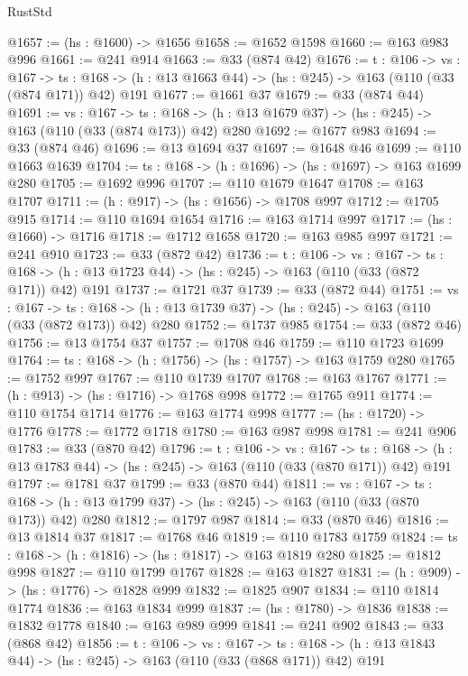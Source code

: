 \begin{lexlean}{RustStd}
\begin{coremodule}
{\begin{coremodule}
{{{@1657 := (hs : @1600) -> @1656
@1658 := @1652 @1598
@1660 := @163 @983 @996
@1661 := @241 @914
@1663 := @33 (@874 @42)
@1676 := {t : @106} ->
  {vs : @167} ->
  {ts : @168} -> (h : @13 @1663 @44) -> (hs : @245) -> @163 (@110 (@33 (@874 @171)) @42) @191
@1677 := @1661 @37
@1679 := @33 (@874 @44)
@1691 := {vs : @167} ->
  {ts : @168} -> (h : @13 @1679 @37) -> (hs : @245) -> @163 (@110 (@33 (@874 @173)) @42) @280
@1692 := @1677 @983
@1694 := @33 (@874 @46)
@1696 := @13 @1694 @37
@1697 := @1648 @46
@1699 := @110 @1663 @1639
@1704 := {ts : @168} -> (h : @1696) -> (hs : @1697) -> @163 @1699 @280
@1705 := @1692 @996
@1707 := @110 @1679 @1647
@1708 := @163 @1707
@1711 := (h : @917) -> (hs : @1656) -> @1708 @997
@1712 := @1705 @915
@1714 := @110 @1694 @1654
@1716 := @163 @1714 @997
@1717 := (hs : @1660) -> @1716
@1718 := @1712 @1658
@1720 := @163 @985 @997
@1721 := @241 @910
@1723 := @33 (@872 @42)
@1736 := {t : @106} ->
  {vs : @167} ->
  {ts : @168} -> (h : @13 @1723 @44) -> (hs : @245) -> @163 (@110 (@33 (@872 @171)) @42) @191
@1737 := @1721 @37
@1739 := @33 (@872 @44)
@1751 := {vs : @167} ->
  {ts : @168} -> (h : @13 @1739 @37) -> (hs : @245) -> @163 (@110 (@33 (@872 @173)) @42) @280
@1752 := @1737 @985
@1754 := @33 (@872 @46)
@1756 := @13 @1754 @37
@1757 := @1708 @46
@1759 := @110 @1723 @1699
@1764 := {ts : @168} -> (h : @1756) -> (hs : @1757) -> @163 @1759 @280
@1765 := @1752 @997
@1767 := @110 @1739 @1707
@1768 := @163 @1767
@1771 := (h : @913) -> (hs : @1716) -> @1768 @998
@1772 := @1765 @911
@1774 := @110 @1754 @1714
@1776 := @163 @1774 @998
@1777 := (hs : @1720) -> @1776
@1778 := @1772 @1718
@1780 := @163 @987 @998
@1781 := @241 @906
@1783 := @33 (@870 @42)
@1796 := {t : @106} ->
  {vs : @167} ->
  {ts : @168} -> (h : @13 @1783 @44) -> (hs : @245) -> @163 (@110 (@33 (@870 @171)) @42) @191
@1797 := @1781 @37
@1799 := @33 (@870 @44)
@1811 := {vs : @167} ->
  {ts : @168} -> (h : @13 @1799 @37) -> (hs : @245) -> @163 (@110 (@33 (@870 @173)) @42) @280
@1812 := @1797 @987
@1814 := @33 (@870 @46)
@1816 := @13 @1814 @37
@1817 := @1768 @46
@1819 := @110 @1783 @1759
@1824 := {ts : @168} -> (h : @1816) -> (hs : @1817) -> @163 @1819 @280
@1825 := @1812 @998
@1827 := @110 @1799 @1767
@1828 := @163 @1827
@1831 := (h : @909) -> (hs : @1776) -> @1828 @999
@1832 := @1825 @907
@1834 := @110 @1814 @1774
@1836 := @163 @1834 @999
@1837 := (hs : @1780) -> @1836
@1838 := @1832 @1778
@1840 := @163 @989 @999
@1841 := @241 @902
@1843 := @33 (@868 @42)
@1856 := {t : @106} ->
  {vs : @167} ->
  {ts : @168} -> (h : @13 @1843 @44) -> (hs : @245) -> @163 (@110 (@33 (@868 @171)) @42) @191
}}}
\end{coremodule}}
\end{coremodule}
\end{lexlean}
